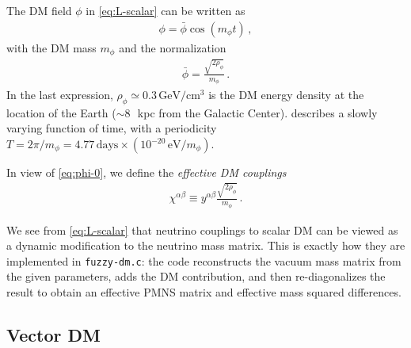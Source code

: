 \documentclass{scrartcl}
\begin{document}
The DM field $\phi$ in \cref{eq:L-scalar} can be written as
\begin{align}
  \phi = \bar\phi \cos(m_\phi t) \,,
  \label{eq:phi-osc}
\end{align}
with the DM mass $m_\phi$ and the normalization
\begin{align}
  \bar\phi = \frac{\sqrt{2 \rho_\phi}}{m_\phi} \,.
  \label{eq:phi-0}
\end{align}
In the last expression, $\rho_\phi \simeq 0.3\,\text{GeV}/\text{cm}^3$ is the
DM energy density at the location of the Earth ($\sim 8$~\,kpc from the
Galactic Center).  describes a slowly varying
function of time, with a periodicity $T = 2\pi/m_\phi = 4.77\,\text{days}
\times (10^{-20}\,\text{eV} / m_\phi)$.

In view of \cref{eq:phi-0}, we define the \emph{effective DM couplings}
\begin{align}
  \chi^{\alpha\beta} \equiv y^{\alpha\beta} \frac{\sqrt{2 \rho_\phi}}{m_\phi} \,.
  \label{eq:chi-dm}
\end{align}

We see from \cref{eq:L-scalar} that neutrino couplings to scalar DM
can be viewed as a dynamic modification to the neutrino mass matrix.
This is exactly how they are implemented in {\tt fuzzy-dm.c}: the code
reconstructs the vacuum mass matrix from the given parameters, adds
the DM contribution, and then re-diagonalizes the result to obtain an
effective PMNS matrix and effective mass squared differences.


\subsection{Vector DM}
\end{document}
